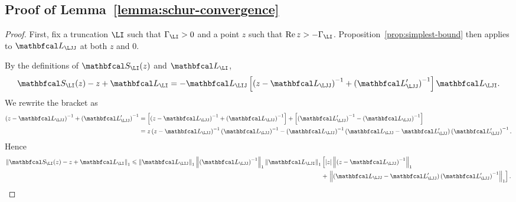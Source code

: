 \documentclass{SciPost}
\renewcommand{\Re}{\operatorname{Re}}
\begin{document}
\subsection{Proof of Lemma~\ref{lemma:schur-convergence}}
\label{sec:lemma-schur-convergence-proof}
\begin{proof}
    First, fix a truncation $\LI$ such that $\Gamma_\LI > 0$ and a point $z$ such that $\Re z>-\Gamma_\LI$. Proposition~\ref{prop:simplest-bound} then applies to $\mathbfcal L_\LJJ$ at both $z$ and $0$.

    By the definitions of \(\mathbfcal S_\LI(z)\) and \(\mathbfcal L_\LI\),
    \begin{equation}
        \mathbfcal S_\LI(z) - z + \mathbfcal L_\LI
        =
        -\mathbfcal L_\LIJ
        \left[
            \left(z - \mathbfcal L_\LJJ\right)^{-1}
            +
            \left(\mathbfcal L'_\LJJ\right)^{-1}
        \right]
        \mathbfcal L_\LJI.
        \label{eq:schur-minus-trunc}
    \end{equation}
    We rewrite the bracket as
    \begin{equation}
        \begin{aligned}
            \left(z - \mathbfcal L_\LJJ\right)^{-1}
            +
            \left(\mathbfcal L'_\LJJ\right)^{-1}
            &=
            \left[
                \left(z - \mathbfcal L_\LJJ\right)^{-1}
                +
                \left(\mathbfcal L_\LJJ\right)^{-1}
            \right]
            +
            \left[
                \left(\mathbfcal L'_\LJJ\right)^{-1}
                -
                \left(\mathbfcal L_\LJJ\right)^{-1}
            \right] \\
            &=
            z\left(z - \mathbfcal L_\LJJ\right)^{-1}\left(\mathbfcal L_\LJJ\right)^{-1}
            -
            \left(\mathbfcal L_\LJJ\right)^{-1}
            \left(
                \mathbfcal L_\LJJ - \mathbfcal L'_\LJJ
            \right)
            \left(\mathbfcal L'_\LJJ\right)^{-1}.
        \end{aligned}
    \end{equation}
    Hence
    \begin{equation}
        \begin{aligned}
            \left \|
            \mathbfcal S_\LI(z) - z + \mathbfcal L_\LI
            \right \|_1
            \leqslant
            \left \| \mathbfcal L_\LIJ \right \|_1
            \left \| \left(\mathbfcal L_\LJJ\right)^{-1} \right \|_1
            \left \| \mathbfcal L_\LJI \right \|_1 &\left[
                |z| 
                \left \|
                    \left(z - \mathbfcal L_\LJJ\right)^{-1}
                \right \|_1 \right . \\ &+ \left. 
                \left \|
                    \left(
                        \mathbfcal L_\LJJ - \mathbfcal L'_\LJJ
                    \right)
                    \left(\mathbfcal L'_\LJJ\right)^{-1}
                \right \|_1
            \right].
        \end{aligned}
        \label{eq:schur-convergence-bound}
    \end{equation}


\end{proof}
\end{document}
